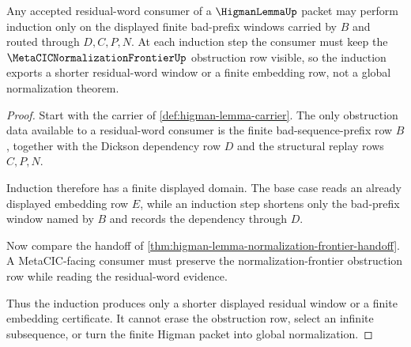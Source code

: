 \begin{theorem}
\label{thm:higman-lemma-finite-bad-prefix-induction}
Any accepted residual-word consumer of a $\HigmanLemmaUp$ packet may perform induction only on the displayed finite bad-prefix windows carried by $B$ and routed through $D,C,P,N$. At each induction step the consumer must keep the $\MetaCICNormalizationFrontierUp$ obstruction row visible, so the induction exports a shorter residual-word window or a finite embedding row, not a global normalization theorem.
\end{theorem}
\begin{proof}
Start with the carrier of \autoref{def:higman-lemma-carrier}. The only obstruction data available to a residual-word consumer is the finite bad-sequence-prefix row $B$, together with the Dickson dependency row $D$ and the structural replay rows $C,P,N$.

Induction therefore has a finite displayed domain. The base case reads an already displayed embedding row $E$, while an induction step shortens only the bad-prefix window named by $B$ and records the dependency through $D$.

Now compare the handoff of \autoref{thm:higman-lemma-normalization-frontier-handoff}. A MetaCIC-facing consumer must preserve the normalization-frontier obstruction row while reading the residual-word evidence.

Thus the induction produces only a shorter displayed residual window or a finite embedding certificate. It cannot erase the obstruction row, select an infinite subsequence, or turn the finite Higman packet into global normalization.
\end{proof}



